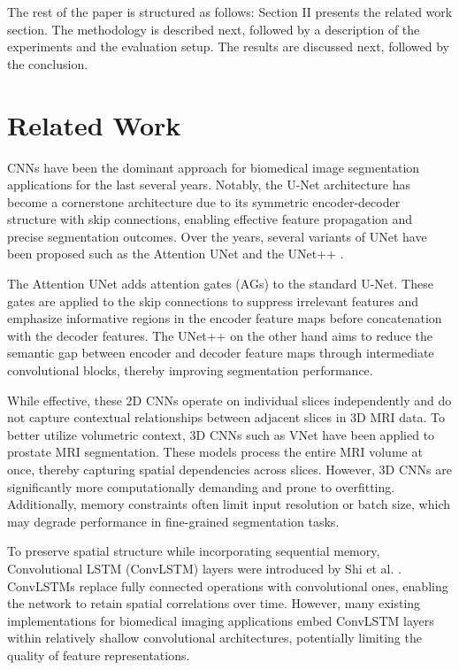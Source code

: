 \documentclass[journal]{IEEEtran}
\begin{document}
The rest of the paper is structured as follows: Section II presents the related work section. The methodology is described next, followed by a description of the experiments and the evaluation setup. The results are discussed next, followed by the conclusion.

\section{Related Work}
CNNs have been the dominant approach for biomedical image segmentation applications for the last several years. Notably, the U-Net architecture \cite{ronneberger2015u} has become a cornerstone architecture due to its symmetric encoder-decoder structure with skip connections, enabling effective feature propagation and precise segmentation outcomes. Over the years, several variants of UNet have been proposed such as the Attention UNet \cite{oktay2018attention} and the UNet++ \cite{zhou2018unet++}. 

The Attention UNet adds attention gates (AGs) to the standard U-Net. These gates are applied to the skip connections to suppress irrelevant features and emphasize informative regions in the encoder feature maps before concatenation with the decoder features. The UNet++ on the other hand aims to reduce the semantic gap between encoder and decoder feature maps through intermediate convolutional blocks, thereby improving segmentation performance.

While effective, these 2D CNNs operate on individual slices independently and do not capture contextual relationships between adjacent slices in 3D MRI data. To better utilize volumetric context, 3D CNNs such as VNet \cite{milletari2016v} have been applied to prostate MRI segmentation. These models process the entire MRI volume at once, thereby capturing spatial dependencies across slices. However, 3D CNNs are significantly more computationally demanding and prone to overfitting. Additionally, memory constraints often limit input resolution or batch size, which may degrade performance in fine-grained segmentation tasks. 

To preserve spatial structure while incorporating sequential memory, Convolutional LSTM (ConvLSTM) layers were introduced by Shi et al. \cite{shi2015convolutional}. ConvLSTMs replace fully connected operations with convolutional ones, enabling the network to retain spatial correlations over time. However, many existing implementations for biomedical imaging applications embed ConvLSTM layers within relatively shallow convolutional architectures, potentially limiting the quality of feature representations.
\end{document}
